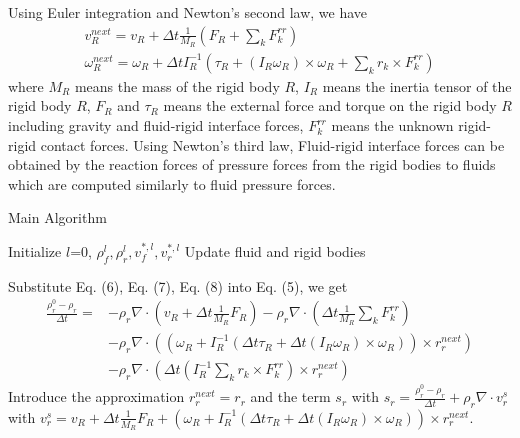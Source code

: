 \documentclass[acmlarge]{acmart}
\begin{document}
Using Euler integration and Newton's second law, we have
\begin{align}
  v_R^{next}=v_R+\Delta t\frac{1}{M_R}(F_R+\sum_k F_k^{rr})\\
  \omega_R^{next}=\omega_R+\Delta t I_R^{-1}(\tau_R+(I_R\omega_R)\times\omega_R+ \sum_k r_k\times F_k^{rr})
\end{align}
where $M_R$ means the mass of the rigid body $R$, $I_R$ means the inertia tensor of the rigid body $R$,
$F_R$ and $\tau_R$ means the external force and torque on the rigid body $R$ including gravity and 
fluid-rigid interface forces, $F_k^{rr}$ means the unknown rigid-rigid contact forces.
Using Newton's third law, Fluid-rigid interface forces can be 
obtained by the reaction forces of pressure forces from the rigid bodies to fluids
which are computed similarly to fluid pressure forces.


\begin{algorithm}[!h]
  \caption*{Main Algorithm}
  \label{MA}
  Initialize $l$=0, $\rho_f^l,\rho_r^l,v_f^{*,l},v_r^{*,l} $ \;
  Update fluid and rigid bodies \;
\end{algorithm}

Substitute Eq. (6), Eq. (7), Eq. (8) into Eq. (5), we get
\begin{align*}
  \frac{\rho_r^0-\rho_r}{\Delta t}=
  &-\rho_r\nabla \cdot (v_R+\Delta t\frac{1}{M_R}F_R)-\rho_r\nabla \cdot (\Delta t\frac{1}{M_R}\sum_k F_k^{rr})\\
  &-\rho_r\nabla \cdot ((\omega_R+I_R^{-1}(\Delta t\tau_R+\Delta t(I_R\omega_R)\times\omega_R))\times r_r^{next})\\
  &-\rho_r\nabla \cdot (\Delta t (I_R^{-1}\sum_k r_k\times F_k^{rr})\times r_r^{next})
\end{align*}
Introduce the approximation $r_r^{next}=r_r$ and the term $s_r$ with $s_r=\frac{\rho_r^0-\rho_r}{\Delta t}+\rho_r\nabla\cdot v_r^s $
with $v_r^s=v_R+\Delta t\frac{1}{M_R}F_R+(\omega_R+I_R^{-1}(\Delta t\tau_R+\Delta t(I_R\omega_R)\times\omega_R))\times r_r^{next} $.
\end{document}
